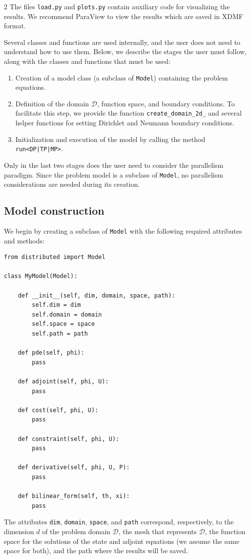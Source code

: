 \documentclass[a4paper, oneside]{article}
\newcommand{\code}[1]{\texttt{#1}}
\begin{document}
\begin{multicols}{2}
The files \code{load.py} and \code{plots.py} contain auxiliary code
for visualizing the results. 
We recommend ParaView \cite{10.5555/2789330} to view the results which are saved in XDMF format. 

Several classes and functions are used internally, and the user does not need
to understand how to use them. Below, we describe the stages the user must follow,
along with the classes and functions that must be used:
\begin{enumerate}[left=0.0em]
\item
Creation of a model class (a subclass of \code{Model})
containing the problem equations. 
\item
Definition of the domain $\mathcal{D}$, function space, and boundary conditions.
To facilitate this step, we provide the function
\code{create\_domain\_2d\_<DP|TP|MP>} and several helper functions
for setting Dirichlet and Neumann boundary conditions. 
\item
Initialization and execution of the model
by calling the method \code{run<DP|TP|MP>}.
\end{enumerate}
Only in the last two stages does the user need to consider the parallelism paradigm.
Since the problem model is a subclass of \code{Model},
no parallelism considerations are needed during its creation.

\subsection{Model construction}
\label{sub:model}

We begin by creating a subclass of \code{Model}
with the following required attributes and methods:
\begin{lstlisting}
from distributed import Model

class MyModel(Model):

    def __init__(self, dim, domain, space, path):
        self.dim = dim
        self.domain = domain
        self.space = space
        self.path = path

	def pde(self, phi):
		pass
	
	def adjoint(self, phi, U):
		pass

	def cost(self, phi, U):
		pass
	
    def constraint(self, phi, U):
		pass

	def derivative(self, phi, U, P):
	 	pass
	
	def bilinear_form(self, th, xi):
		pass
\end{lstlisting}
The attributes \code{dim}, \code{domain}, \code{space}, and \code{path}
correspond, respectively, to the dimension $d$ of the problem domain $\mathcal{D}$,
the mesh that represents $\mathcal{D}$,
the function space for the solutions of the state and adjoint equations
(we assume the same space for both),
and the path where the results will be saved. 


\end{multicols}
\end{document}
